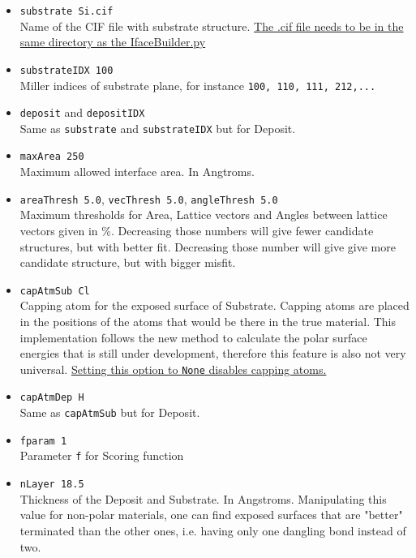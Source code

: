 \documentclass[a4paper,12pt,oneside]{article}
\begin{document}
\begin{itemize}
\item{\texttt{substrate   Si.cif}}\\
Name of the CIF file with substrate structure. \uline{The .cif file needs to be in the same directory as the IfaceBuilder.py}

\item{\texttt{substrateIDX  100}}\\
Miller indices of substrate plane, for instance \texttt{100, 110, 111, 212,...}

\item{\texttt{deposit} and \texttt{depositIDX}}\\
Same as \texttt{substrate} and \texttt{substrateIDX} but for Deposit.

\item{\texttt{maxArea       250}}\\
Maximum allowed interface area. In Angtroms. 

\item{\texttt{areaThresh    5.0}, \texttt{vecThresh     5.0},
\texttt{angleThresh   5.0}} \\
Maximum thresholds for Area, Lattice vectors and Angles between lattice vectors
given in \%. Decreasing those numbers will give fewer candidate structures, but with
better fit. Decreasing those number will give give more candidate structure, but
with bigger misfit. 

\item{\texttt{capAtmSub     Cl}}\\
Capping atom for the exposed surface of Substrate. Capping atoms are placed in
the positions of the atoms that would be there in the true material. This
implementation follows the new method to calculate the polar surface energies
that is still under development, therefore this feature is also not very
universal. \uline{Setting this option to \texttt{None} disables capping atoms.}

\item{\texttt{capAtmDep     H}}\\
Same as \texttt{capAtmSub} but for Deposit.

\item{\texttt{fparam   1}}\\
Parameter \texttt{f} for Scoring function

\item{\texttt{nLayer  18.5}}\\
Thickness of the Deposit and Substrate. In Angstroms. 
Manipulating this value for non-polar materials, one can find exposed 
surfaces that are "better"
terminated than the other ones, i.e. having only one dangling bond instead of two. 


\end{itemize}
\end{document}
